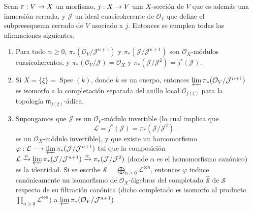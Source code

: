 \documentclass[oneside,10pt]{amsart}
\makeatletter
\newcommand{\ega@arrow}[2]{\mathchoice{#1}{#2}{#2}{#2}}
\renewcommand{\to}{\ega@arrow{\longrightarrow}{\rightarrow}}
\let\EGAOriginalLabel\label
\renewcommand{\label}[1]{\phantomsection\EGAOriginalLabel{#1}}
\makeatother
\begin{document}
\begin{lemma}[8.10.1]
\label{II.8.10.1-fr}
Sean $\pi:V\to X$ un morfismo, $j:X\to V$ una $X$-sección de $V$ que es además una inmersión cerrada, y $\mathcal{J}$ un ideal cuasicoherente de $\mathcal{O}_V$ que define el subpreesquema cerrado de $V$ asociado a $j$.
Entonces se cumplen todas las afirmaciones siguientes.
\begin{enumerate}
  \item[\rm{(i)}] Para todo $n\geqslant 0$, $\pi_*(\mathcal{O}_V/\mathcal{J}^{n+1})$ y $\pi_*(\mathcal{J}/\mathcal{J}^{n+1})$ son $\mathcal{O}_X$-módulos cuasicoherentes, y $\pi_*(\mathcal{O}_V/\mathcal{J})=\mathcal{O}_X$ y $\pi_*(\mathcal{J}/\mathcal{J}^2)=j^*(\mathcal{J})$.
  \item[\rm{(ii)}] Si $X=\{\xi\}=\operatorname{Spec}(k)$, donde $k$ es un cuerpo, entonces $\varprojlim\pi_*(\mathcal{O}_V/\mathcal{J}^{n+1})$ es isomorfo a la completación separada del anillo local $\mathcal{O}_{j(\xi)}$ para la topología $\mathfrak{m}_{j(\xi)}$-ádica.
  \item[\rm{(iii)}] Supongamos que $\mathcal{J}$ es un $\mathcal{O}_V$-módulo invertible (lo cual implica que
    \[
    \mathcal{L}=j^*(\mathcal{J})=
    \pi_*(\mathcal{J}/\mathcal{J}^2)
  \]
    es un $\mathcal{O}_X$-módulo invertible), y que existe un homomorfismo $\varphi:\mathcal{L}\longrightarrow\varprojlim\pi_*(\mathcal{J}/\mathcal{J}^{n+1})$ tal que la composición $\mathcal{L}\xrightarrow{\varphi}\varprojlim\pi_*(\mathcal{J}/\mathcal{J}^{n+1})\xrightarrow{\alpha}\pi_*(\mathcal{J}/\mathcal{J}^2)$ (donde $\alpha$ es el homomorfismo canónico) es la identidad.
    Si se escribe $\mathcal{S}=\bigoplus_{n\geqslant0}\mathcal{L}^{\otimes n}$, entonces $\varphi$ induce canónicamente un isomorfismo de $\mathcal{O}_X$-álgebras del completado $\widehat{\mathcal{S}}$ de $\mathcal{S}$ respecto de su filtración canónica (dicho completado es isomorfo al producto $\prod_{n\geqslant0}\mathcal{L}^{\otimes n}$) a $\varprojlim\pi_*(\mathcal{O}_V/\mathcal{J}^{n+1})$.
\end{enumerate}
\end{lemma}
\end{document}

